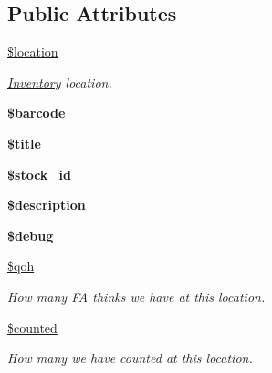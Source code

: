 \subsection*{Public Attributes}
\begin{DoxyCompactItemize}
\item 
\hypertarget{classitem_a960d2ea48d7f3b60b7fe360e10b331f7}{}\label{classitem_a960d2ea48d7f3b60b7fe360e10b331f7} 
\hyperlink{classitem_a960d2ea48d7f3b60b7fe360e10b331f7}{\$location}
\begin{DoxyCompactList}\small\item\em \hyperlink{class_inventory}{Inventory} location. \end{DoxyCompactList}\item 
\hypertarget{classitem_a1d115888a094a2d8b1af138cb872dadd}{}\label{classitem_a1d115888a094a2d8b1af138cb872dadd} 
{\bfseries \$barcode}
\item 
\hypertarget{classitem_a06cded759cb0ed22235de6288a6d56be}{}\label{classitem_a06cded759cb0ed22235de6288a6d56be} 
{\bfseries \$title}
\item 
\hypertarget{classitem_a3bd53b1d94f98aaea6065fd652d21962}{}\label{classitem_a3bd53b1d94f98aaea6065fd652d21962} 
{\bfseries \$stock\+\_\+id}
\item 
\hypertarget{classitem_a3a05562f1a44a3afbde5af0382503e8e}{}\label{classitem_a3a05562f1a44a3afbde5af0382503e8e} 
{\bfseries \$description}
\item 
\hypertarget{classitem_aa8fccc6e8adc31bc3f93609244f8b6a8}{}\label{classitem_aa8fccc6e8adc31bc3f93609244f8b6a8} 
{\bfseries \$debug}
\item 
\hypertarget{classitem_a4bc44758eac5607db2febc8fb03a47aa}{}\label{classitem_a4bc44758eac5607db2febc8fb03a47aa} 
\hyperlink{classitem_a4bc44758eac5607db2febc8fb03a47aa}{\$qoh}
\begin{DoxyCompactList}\small\item\em How many FA thinks we have at this location. \end{DoxyCompactList}\item 
\hypertarget{classitem_aab048fbbe2ff803cf2367fa465be0f3a}{}\label{classitem_aab048fbbe2ff803cf2367fa465be0f3a} 
\hyperlink{classitem_aab048fbbe2ff803cf2367fa465be0f3a}{\$counted}
\begin{DoxyCompactList}\small\item\em How many we have counted at this location. \end{DoxyCompactList}\end{DoxyCompactItemize}


